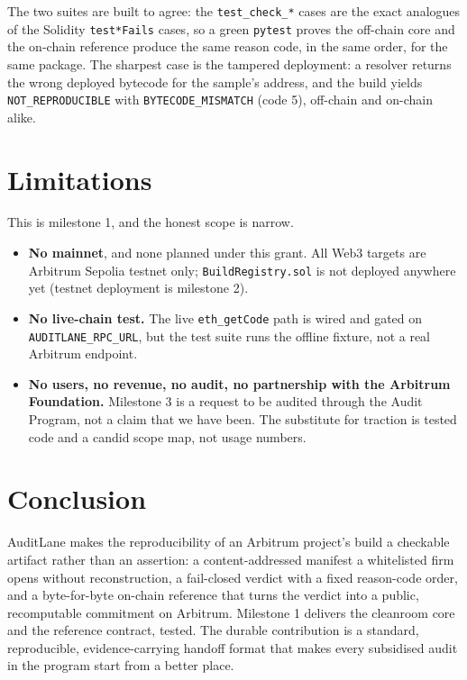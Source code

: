 \documentclass[11pt]{article}
\begin{document}
The two suites are built to agree: the \texttt{test\_check\_*} cases are the exact
analogues of the Solidity \texttt{test*Fails} cases, so a green \texttt{pytest} proves the
off-chain core and the on-chain reference produce the same reason code, in the same order,
for the same package. The sharpest case is the tampered deployment: a resolver returns the
wrong deployed bytecode for the sample's address, and the build yields
\texttt{NOT\_REPRODUCIBLE} with \texttt{BYTECODE\_MISMATCH} (code 5), off-chain and
on-chain alike.

\section{Limitations}\label{sec:limits}
This is milestone 1, and the honest scope is narrow.
\begin{itemize}[leftmargin=1.4em]
\item \textbf{No mainnet}, and none planned under this grant. All Web3 targets are Arbitrum
Sepolia testnet only; \texttt{BuildRegistry.sol} is not deployed anywhere yet (testnet
deployment is milestone 2).
\item \textbf{No live-chain test.} The live \texttt{eth\_getCode} path is wired and gated
on \texttt{AUDITLANE\_RPC\_URL}, but the test suite runs the offline fixture, not a real
Arbitrum endpoint.
\item \textbf{No users, no revenue, no audit, no partnership with the Arbitrum Foundation.}
Milestone 3 is a request to be audited through the Audit Program, not a claim that we have
been. The substitute for traction is tested code and a candid scope map, not usage numbers.
\end{itemize}

\section{Conclusion}
AuditLane makes the reproducibility of an Arbitrum project's build a checkable artifact
rather than an assertion: a content-addressed manifest a whitelisted firm opens without
reconstruction, a fail-closed verdict with a fixed reason-code order, and a byte-for-byte
on-chain reference that turns the verdict into a public, recomputable commitment on
Arbitrum. Milestone 1 delivers the cleanroom core and the reference contract, tested. The
durable contribution is a standard, reproducible, evidence-carrying handoff format that
makes every subsidised audit in the program start from a better place.



\end{document}
